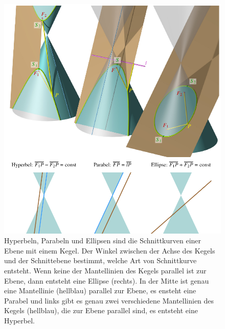 %
%
\begin{figure}
\centering
\includegraphics{chapters/030-geometrie/images/kegelschnitte.pdf}
\caption{Hyperbeln, Parabeln und Ellipsen sind die Schnittkurven einer
Ebene mit einem Kegel.
Der Winkel zwischen der Achse des Kegels und der Schnittebene bestimmt,
welche Art von Schnittkurve entsteht.
Wenn keine der Mantellinien des Kegels parallel ist zur Ebene, dann
entsteht eine Ellipse (rechts).
In der Mitte ist genau eine Mantellinie (hellblau) parallel zur Ebene,
es ensteht eine Parabel und links gibt es genau zwei verschiedene
Mantellinien des Kegels (hellblau), die zur Ebene parallel sind,
es entsteht eine Hyperbel.
\label{buch:geometrie:laenge:fig:kegelschnitte}}
\end{figure}
%

%
%
